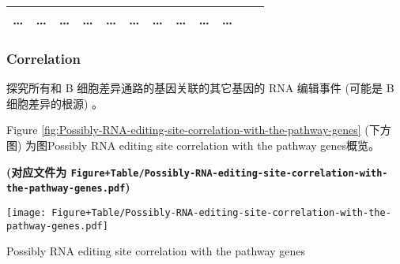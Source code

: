 \documentclass[
]{article}
\begin{document}
\begin{longtable}[]{@{}llllllllllll@{}}
\begin{minipage}[t]{0.06\columnwidth}
\ldots{}\strut
\end{minipage} & \begin{minipage}[t]{0.06\columnwidth}\raggedright
\ldots{}\strut
\end{minipage} & \begin{minipage}[t]{0.06\columnwidth}\raggedright
\ldots{}\strut
\end{minipage} & \begin{minipage}[t]{0.06\columnwidth}\raggedright
\ldots{}\strut
\end{minipage} & \begin{minipage}[t]{0.08\columnwidth}\raggedright
\ldots{}\strut
\end{minipage} & \begin{minipage}[t]{0.06\columnwidth}\raggedright
\ldots{}\strut
\end{minipage} & \begin{minipage}[t]{0.06\columnwidth}\raggedright
\ldots{}\strut
\end{minipage} & \begin{minipage}[t]{0.09\columnwidth}\raggedright
\ldots{}\strut
\end{minipage} & \begin{minipage}[t]{0.06\columnwidth}\raggedright
\ldots{}\strut
\end{minipage} & \begin{minipage}[t]{0.02\columnwidth}\raggedright
\ldots{}\strut
\end{minipage}\tabularnewline
\bottomrule
\end{longtable}

\hypertarget{correlation}{%
\subsubsection{Correlation}\label{correlation}}

探究所有和 B 细胞差异通路的基因关联的其它基因的 RNA 编辑事件 (可能是 B 细胞差异的根源) 。

Figure \ref{fig:Possibly-RNA-editing-site-correlation-with-the-pathway-genes} (下方图) 为图Possibly RNA editing site correlation with the pathway genes概览。

\textbf{(对应文件为 \texttt{Figure+Table/Possibly-RNA-editing-site-correlation-with-the-pathway-genes.pdf})}

\def\@captype{figure}
\begin{center}
\texttt{[image: Figure+Table/Possibly-RNA-editing-site-correlation-with-the-pathway-genes.pdf]}
\caption{Possibly RNA editing site correlation with the pathway genes}\label{fig:Possibly-RNA-editing-site-correlation-with-the-pathway-genes}
\end{center}
\end{document}
